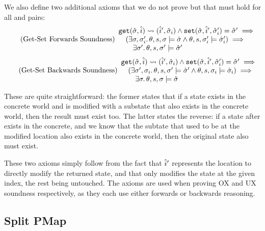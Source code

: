We also define two additional axioms that we do not prove but that must hold for all  and  pairs:
\begin{equation}
\tag{Get-Set Forwards Soundness}\label{eq:getset-sound}
\begin{array}{l}
\texttt{get}(\hat{\sigma},\hat{i})\rightsquigarrow(\hat{i}', \hat{\sigma}_i) \land \texttt{set}(\hat{\sigma}, \hat{i}', \hat{\sigma}_i')=\hat{\sigma}' \implies \\
\quad (\exists \sigma,\sigma_i'\ldotp \theta,s,\sigma\models\hat{\sigma} \land \theta,s,\sigma_i'\models\hat{\sigma}_i') \implies \\
\qquad \exists \sigma'\ldotp \theta,s,\sigma'\models\hat{\sigma}'
\end{array}
\end{equation}
\begin{equation}
\tag{Get-Set Backwards Soundness}\label{eq:getset-sound}
\begin{array}{l}
\texttt{get}(\hat{\sigma},\hat{i})\rightsquigarrow(\hat{i}', \hat{\sigma}_i) \land \texttt{set}(\hat{\sigma}, \hat{i}', \hat{\sigma}_i')=\hat{\sigma}' \implies \\
\quad (\exists \sigma',\sigma_i\ldotp \theta,s,\sigma'\models\hat{\sigma}' \land \theta,s,\sigma_i\models\hat{\sigma}_i) \implies \\
\qquad \exists \sigma\ldotp \theta,s,\sigma\models\hat{\sigma}
\end{array}
\end{equation}

These are quite straightforward: the former states that if a state exists in the concrete world and is modified with a substate that also exists in the concrete world, then the result must exist too. The latter states the reverse: if a state after  exists in the concrete, and we know that the subtate that used to be at the modified location also exists in the concrete world, then the original state also must exist.

These two axioms simply follow from the fact that $\hat{i}'$ represents the location to directly modify the returned state, and that  only modifies the state at the given index, the rest being untouched. The axioms are used when proving OX and UX soundness respectively, as they each use either forwards or backwards reasoning.

\subsection{Split PMap}

